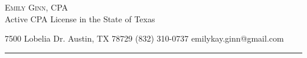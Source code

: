 \documentclass[10pt,A4]{article}
\newcommand{\metasection}[3]
{
{#1} \hspace*{\fill} {#2} \hspace*{\fill} {#3}\\[1pt]
}
\begin{document}
\pagestyle{fancy}	








\vspace{-8pt}
\begin{center}
	\HUGE \textsc{Emily Ginn, CPA} \textcolor{sectcol}\\
    \vspace{2pt}
	\small Active CPA License in the State of Texas
    \vspace{-4pt}
\end{center}





\footnotesize
\metasection{7500 Lobelia Dr. Austin, TX 78729}{(832) 310-0737}{emilykay.ginn@gmail.com}
\vspace{-2pt}
\textcolor{softcol}{\hrule}
\vspace{6pt}

\normalsize
\end{document}
